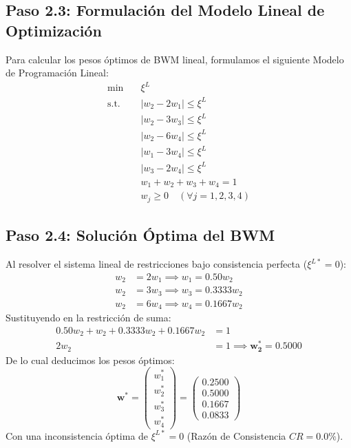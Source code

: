 \documentclass[11pt, letterpaper]{article}
\begin{document}
\subsection{Paso 2.3: Formulación del Modelo Lineal de Optimización}
Para calcular los pesos óptimos de BWM lineal, formulamos el siguiente Modelo de Programación Lineal:
\begin{align}
    \min \quad &\xi^L \nonumber \\
    \text{s.t.} \quad & |w_2 - 2w_1| \le \xi^L \nonumber \\
                      & |w_2 - 3w_3| \le \xi^L \nonumber \\
                      & |w_2 - 6w_4| \le \xi^L \nonumber \\
                      & |w_1 - 3w_4| \le \xi^L \nonumber \\
                      & |w_3 - 2w_4| \le \xi^L \nonumber \\
                      & w_1 + w_2 + w_3 + w_4 = 1 \nonumber \\
                      & w_j \ge 0 \quad (\forall j = 1,2,3,4)
\end{align}

\subsection{Paso 2.4: Solución Óptima del BWM}
Al resolver el sistema lineal de restricciones bajo consistencia perfecta ($\xi^{L*} = 0$):
\begin{align*}
    w_2 &= 2w_1 \implies w_1 = 0.50 w_2 \\
    w_2 &= 3w_3 \implies w_3 = 0.3333 w_2 \\
    w_2 &= 6w_4 \implies w_4 = 0.1667 w_2
\end{align*}
Sustituyendo en la restricción de suma:
\begin{align*}
    0.50 w_2 + w_2 + 0.3333 w_2 + 0.1667 w_2 &= 1 \\
    2 w_2 &= 1 \implies \mathbf{w_2^* = 0.5000}
\end{align*}
De lo cual deducimos los pesos óptimos:
\begin{equation}
    \mathbf{w}^* = \begin{pmatrix} w_1^* \\ w_2^* \\ w_3^* \\ w_4^* \end{pmatrix} = \begin{pmatrix} 0.2500 \\ 0.5000 \\ 0.1667 \\ 0.0833 \end{pmatrix}
\end{equation}
Con una inconsistencia óptima de $\xi^{L*} = 0$ (Razón de Consistencia $CR = 0.0\%$).
\end{document}
